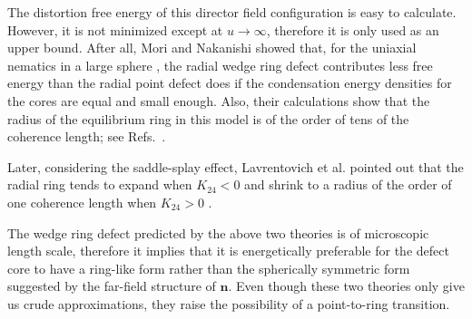 \documentclass[nottitlepage]{article}
\begin{document}
      The distortion free energy of this director field configuration is easy to calculate. However, %
it is not minimized except at $u\to \infty$, therefore it is only used as an upper bound. After all, Mori and Nakanishi showed that, for the uniaxial nematics in a large sphere%
      , the radial wedge ring defect contributes less free energy than the radial point defect does if the condensation energy densities for the cores are equal and small enough. Also, their calculations show that the radius of the equilibrium ring in this model is of the order of tens of the coherence length; see Refs.~\cite{fukuda, terentjev}.

      Later, considering the saddle-splay effect, Lavrentovich et al. pointed out that the radial ring tends to expand when $K_{24}<0$ and shrink to a radius of the order of one coherence length when $K_{24}>0$ \cite{lavrentovich}. %

   The wedge ring defect predicted by the above two theories is of microscopic length scale, therefore it implies that it is energetically preferable for the defect core to have a ring-like form rather than the spherically symmetric form suggested by the far-field structure of $\mathbf{n}$. Even though these two theories only give us crude approximations, they raise the possibility of a point-to-ring transition.%
\end{document}
